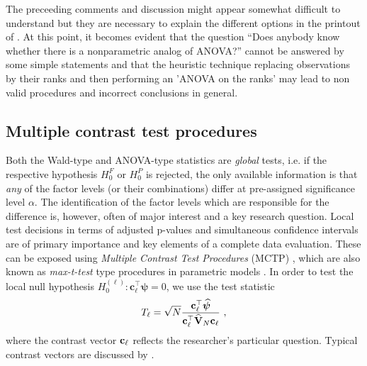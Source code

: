 The preceeding comments and discussion might appear somewhat difficult to 
understand but they are necessary to explain the different options in the 
printout of . At this point, it becomes evident that the question 
``Does anybody know whether there is a nonparametric analog of ANOVA?'' cannot 
be answered by some simple statements and that the heuristic technique 
replacing observations by their ranks and then performing an 'ANOVA on the 
ranks' may lead to non valid procedures and incorrect conclusions in general.

\subsection{Multiple contrast test procedures}\label{subsec:MTCP}
Both the Wald-type and ANOVA-type statistics are \textit{global} tests, i.e. if 
the respective hypothesis $H_0^F$ or $H_0^P$ is rejected, the only available 
information is that \textit{any} of the factor levels (or their combinations) 
differ at pre-assigned significance level $\alpha$. The identification of the factor levels which are responsible for the difference is, however, often of major interest and a key research question. 
Local test decisions in terms of adjusted p-values and simultaneous confidence 
intervals are of primary importance and key elements of a complete data 
evaluation. These can be exposed using \textit{Multiple Contrast Test 
Procedures} (MCTP) \citep{bretz2001numerical, hothorn2008simultaneous, 
konietschke2012rank}, which are also known as \textit{max-t-test} type 
procedures in parametric models \citep{konietschke2020small}. In order to test 
the local null hypothesis $H_0^{(\ell)}: \mathbf{c}_\ell^\top\bm{\psi} = 0$, we 
use the test statistic
\begin{eqnarray}
T_{\ell} = \sqrt{N} \frac{\mathbf{c}_\ell^\top\widehat{\bm{\psi}}}{\mathbf{c}_\ell^\top 
\widehat{\mathbf{V}}_N \mathbf{c}_\ell} \ , \label{tellmcp}
\end{eqnarray}
where the contrast vector $\mathbf{c}_\ell$ reflects the researcher's particular 
question. Typical contrast vectors are discussed by \cite{bretz2001numerical}.


